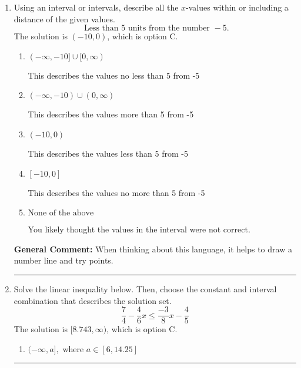 \documentclass{extbook}[14pt]
\newcommand{\litem}[1]{\item #1

\rule{\textwidth}{0.4pt}}
\begin{document}
\begin{enumerate}
{\begin{enumerate}[label=\Alph*.]
* $(-1.73, 8.80]$, which is the correct option.
\item \( (-\infty, a) \cup [b, \infty), \text{ where } a \in [-3, 0] \text{ and } b \in [4.5, 12.75] \)

$(-\infty, -1.73) \cup [8.80, \infty)$, which corresponds to displaying the and-inequality as an or-inequality.
\item \( (-\infty, a] \cup (b, \infty), \text{ where } a \in [-2.25, 1.5] \text{ and } b \in [7.5, 15] \)

$(-\infty, -1.73] \cup (8.80, \infty)$, which corresponds to displaying the and-inequality as an or-inequality AND flipping the inequality.
\item \( [a, b), \text{ where } a \in [-3, -0.75] \text{ and } b \in [6.75, 11.25] \)

$[-1.73, 8.80)$, which corresponds to flipping the inequality.
\item \( \text{None of the above.} \)


\end{enumerate}

\textbf{General Comment:} To solve, you will need to break up the compound inequality into two inequalities. Be sure to keep track of the inequality! It may be best to draw a number line and graph your solution.
}
\litem{
Using an interval or intervals, describe all the $x$-values within or including a distance of the given values.
\[ \text{ Less than } 5 \text{ units from the number } -5. \]The solution is \( (-10, 0) \), which is option C.\begin{enumerate}[label=\Alph*.]
\item \( (-\infty, -10] \cup [0, \infty) \)

This describes the values no less than 5 from -5
\item \( (-\infty, -10) \cup (0, \infty) \)

This describes the values more than 5 from -5
\item \( (-10, 0) \)

This describes the values less than 5 from -5
\item \( [-10, 0] \)

This describes the values no more than 5 from -5
\item \( \text{None of the above} \)

You likely thought the values in the interval were not correct.
\end{enumerate}

\textbf{General Comment:} When thinking about this language, it helps to draw a number line and try points.
}
\litem{
Solve the linear inequality below. Then, choose the constant and interval combination that describes the solution set.
\[ \frac{7}{4} - \frac{4}{6} x \leq \frac{-3}{8} x - \frac{4}{5} \]The solution is \( [8.743, \infty) \), which is option C.\begin{enumerate}[label=\Alph*.]
\item \( (-\infty, a], \text{ where } a \in [6, 14.25] \)


\end{enumerate}}
\end{enumerate}
\end{document}
